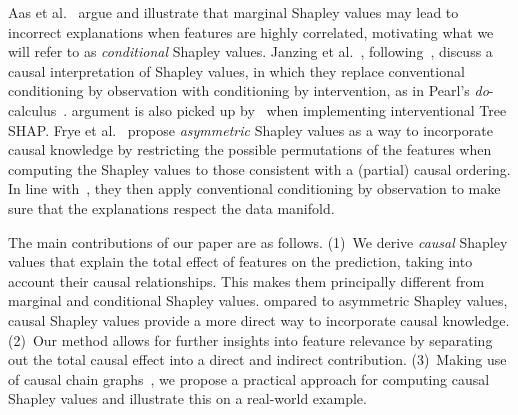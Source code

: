 \documentclass{article}
\begin{document}
Aas et al.~\cite{aas2019explaining} argue and illustrate that marginal Shapley values may lead to incorrect explanations when features are highly correlated, motivating what we will refer to as {\em conditional} Shapley values. Janzing et al.~\cite{janzing2019feature}, following~\cite{datta2016algorithmic}, discuss a causal interpretation of Shapley values, in which they replace conventional conditioning by observation with conditioning by intervention, as in Pearl's {\em do}-calculus~\cite{pearl2012calculus}.   argument is also picked up by~\cite{lundberg2020local} when implementing interventional Tree SHAP. Frye et al.~\cite{frye2019asymmetric} propose {\em asymmetric} Shapley values as a way to incorporate causal knowledge  by restricting the possible permutations of the features when computing the Shapley values to those consistent with a (partial) causal ordering. In line with~\cite{aas2019explaining}, they then apply conventional conditioning by observation to make sure that the explanations respect the data manifold.

The main contributions of our paper are as follows.
(1)~We derive {\em causal} Shapley values that explain the total effect of features on the prediction, taking into account their causal relationships. This makes them principally different from marginal and conditional Shapley values. ompared to asymmetric Shapley values, causal Shapley values provide a more direct  way to incorporate causal knowledge. (2)~Our method allows for further insights into feature relevance by separating out the total causal effect into a direct and indirect contribution. 
(3)~Making use of causal chain graphs~\cite{lauritzen2002chain}, we propose a practical approach for computing causal Shapley values and illustrate this on a real-world example.

\section{}
\label{sec:interpretation}
\end{document}
